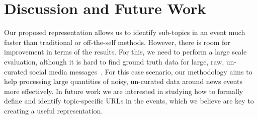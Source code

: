 \section{Discussion and Future Work}\label{sec:conclusions}


Our proposed representation allows us to identify sub-topics in an event much
faster than traditional or off-the-self methods.
%
However, there is room for improvement in terms of the results.
%
For this, we need to perform a large scale evaluation, although it is hard to
find ground truth data for large, raw, un-curated social media
messages~\cite{Alonso:2015:WCW:2740908.2745397}.
%
For this case scenario, our methodology aims to help processing large quantities
of noisy, un-curated data around news events more effectively.
%
In future work we are interested in studying how to formally define and identify
topic-specific URLs in the events, which we believe are key to creating a useful
representation.
%
%